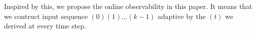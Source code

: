 \begin{comment}
 The input \Input$(t)$ we chose should make every two distinct states \State$^{i}(t)$ , \State$^{j}(t)$$\in$ \Ustate$(t)$ will not turn into be the same state after affected by \Input$(t)$.  \ly{Therefore,   there is exact one $s\in $ \Ustate$(t)$ such that $s\xrightarrow
{i(t)} s_1$ for each $s_1\in $ \Ustate$(t+1)$.} And the \Ustate$(t+1)$ is derived by the input \Input$(t)$ and \Output$(t+1)$, and we have $|$\Ustate$(t+1)$$|\le|$\Ustate$(t)$$|$. If $|$\Ustate$(t+1)$$|=1$,  we can determine \State$(t+1)$.  Employing the update rules and \Input$(t)$, we can determine the  \State$(t)$.  Repeating this step, we  determine the initial state \State$(0)$ of the \BCN.
\end{comment}

\begin{comment} 
But we can also determine the set of possible initial states \Ustate$(0)$ by initial output \Output$(0)$ we observe, and then we can use different input sequences (\Input$^{1}(0)$\Input$^{1}(1)\ldots$\Input$^{1}(k)$, \Input$^{2}(0)$\Input$^{2}(1)\ldots$\Input$^{2}(k)$, $\ldots$) to determine initial state for different sets of possible initial states (\Ustate$^{1}(0)$, \Ustate$^{2}(0)$, $\ldots$). In this case, the requirements for \BCNs\ to determine the initail state would be easier to satisfy. 
\end{comment}

Inspired by this, we propose the online observability in this paper. It means that we contruct input sequence \Input$(0)$\Input$(1)\ldots$\Input$(k-1)$ adaptive by the \Ustate$(t)$ we derived at every time step. %

